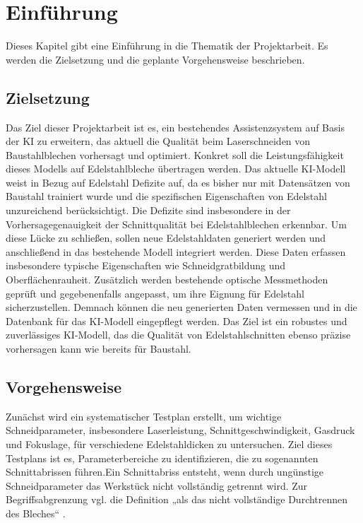 \chapter{Einführung}

Dieses Kapitel gibt eine Einführung in die Thematik der Projektarbeit. Es werden die Zielsetzung und die geplante Vorgehensweise beschrieben. 

\section{Zielsetzung}Das Ziel dieser Projektarbeit ist es, ein bestehendes Assistenzsystem auf Basis der \ac{KI} zu erweitern, das aktuell die Qualität beim Laserschneiden von Baustahlblechen vorhersagt und optimiert. Konkret soll die Leistungsfähigkeit dieses Modells auf Edelstahlbleche übertragen werden. Das aktuelle \ac{KI}-Modell weist in Bezug auf Edelstahl Defizite auf, da es bisher nur mit Datensätzen von Baustahl trainiert wurde und die spezifischen Eigenschaften von Edelstahl unzureichend berücksichtigt. Die Defizite sind insbesondere in der Vorhersagegenauigkeit der Schnittqualität bei Edelstahlblechen erkennbar.
Um diese Lücke zu schließen, sollen neue Edelstahldaten generiert werden und anschließend in das bestehende Modell integriert werden. Diese Daten erfassen insbesondere typische Eigenschaften wie Schneidgratbildung und Oberflächenrauheit. Zusätzlich werden bestehende optische Messmethoden geprüft und gegebenenfalls angepasst, um ihre Eignung für Edelstahl sicherzustellen. Demnach können die neu generierten Daten vermessen und in die Datenbank für das \ac{KI}-Modell eingepflegt werden. Das Ziel ist ein robustes und zuverlässiges \ac{KI}-Modell, das die Qualität von Edelstahlschnitten ebenso präzise vorhersagen kann wie bereits für Baustahl.

\section{Vorgehensweise}
Zunächst wird ein systematischer Testplan erstellt, um wichtige Schneidparameter, insbesondere Laserleistung, Schnittgeschwindigkeit, Gasdruck und Fokuslage, für verschiedene Edelstahldicken zu untersuchen. Ziel dieses Testplans ist es, Parameterbereiche zu identifizieren, die zu sogenannten Schnittabrissen führen.Ein Schnittabriss entsteht, wenn durch ungünstige Schneidparameter das Werkstück nicht vollständig getrennt wird.
Zur Begriffsabgrenzung vgl. die Definition „als das nicht vollständige Durchtrennen des Bleches“ \cite{Schindhelm2014}.

